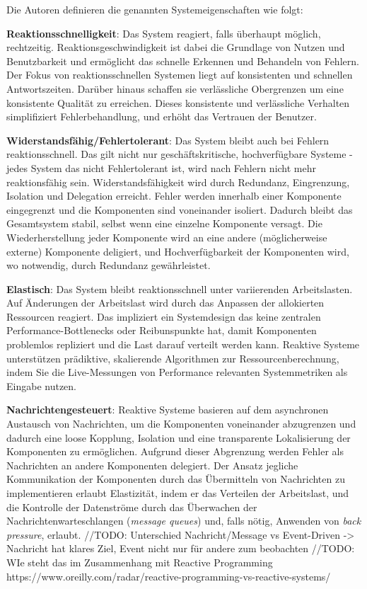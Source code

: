 Die Autoren definieren die genannten Systemeigenschaften wie folgt:

\textbf{Reaktionsschnelligkeit}: Das System reagiert, falls überhaupt möglich, rechtzeitig. Reaktionsgeschwindigkeit ist dabei die Grundlage von Nutzen und
Benutzbarkeit und ermöglicht das schnelle Erkennen und Behandeln von Fehlern.
Der Fokus von reaktionsschnellen Systemen liegt auf konsistenten und schnellen Antwortszeiten. Darüber hinaus schaffen sie
verlässliche Obergrenzen um eine konsistente Qualität zu erreichen.
Dieses konsistente und verlässliche Verhalten simplifiziert Fehlerbehandlung, und erhöht das Vertrauen der Benutzer.

\textbf{Widerstandsfähig/Fehlertolerant}: Das System bleibt auch bei Fehlern reaktionsschnell. Das gilt nicht nur geschäftskritische, hochverfügbare Systeme -
jedes System das nicht Fehlertolerant ist, wird nach Fehlern nicht mehr reaktionsfähig sein.
Widerstandsfähigkeit wird durch Redundanz, Eingrenzung, Isolation und Delegation erreicht.
Fehler werden innerhalb einer Komponente eingegrenzt und die Komponenten sind voneinander isoliert. Dadurch bleibt das Gesamtsystem stabil, selbst
wenn eine einzelne Komponente versagt.
Die Wiederherstellung jeder Komponente wird an eine andere (möglicherweise externe) Komponente deligiert, und
Hochverfügbarkeit der Komponenten wird, wo notwendig, durch Redundanz gewährleistet.

\textbf{Elastisch}: Das System bleibt reaktionsschnell unter variierenden Arbeitslasten. Auf Änderungen der Arbeitslast wird durch das Anpassen der
allokierten Ressourcen reagiert. Das impliziert ein Systemdesign das keine zentralen Performance-Bottlenecks oder Reibunspunkte hat, damit
Komponenten problemlos repliziert und die Last darauf verteilt werden kann.
Reaktive Systeme unterstützen prädiktive, skalierende Algorithmen zur Ressourcenberechnung,
indem Sie die Live-Messungen von Performance relevanten Systemmetriken als Eingabe nutzen.

\textbf{Nachrichtengesteuert}: Reaktive Systeme basieren auf dem asynchronen Austausch von Nachrichten, um die Komponenten voneinander abzugrenzen und dadurch
eine loose Kopplung, Isolation und eine transparente Lokalisierung der Komponenten zu ermöglichen.
Aufgrund dieser Abgrenzung werden Fehler als Nachrichten an andere Komponenten delegiert.
Der Ansatz jegliche Kommunikation der Komponenten durch das Übermitteln von Nachrichten zu implementieren erlaubt Elastizität,
indem er das Verteilen der Arbeitslast, und die Kontrolle der Datenströme durch das Überwachen der Nachrichtenwarteschlangen
(\textit{message queues}) und, falls nötig, Anwenden von \textit{back pressure}, erlaubt.\parencite{ReactiveSystems}
//TODO: Unterschied Nachricht/Message vs Event-Driven -> Nachricht hat klares Ziel, Event nicht nur für andere zum beobachten
//TODO: WIe steht das im Zusammenhang mit Reactive Programming https://www.oreilly.com/radar/reactive-programming-vs-reactive-systems/
